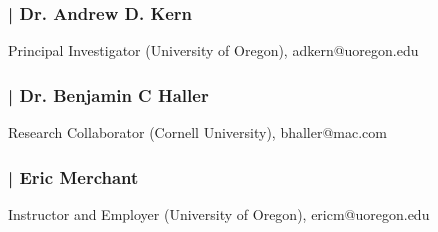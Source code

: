 \documentclass[paper=a4,fontsize=11pt]{scrartcl} %
\begin{document}
\subsubsection*{| Dr. Andrew D. Kern}
\begin{center}
Principal Investigator (University of Oregon),
adkern@uoregon.edu
\end{center}

\subsubsection*{| Dr. Benjamin C Haller} 
\begin{center}
Research Collaborator (Cornell University),
bhaller@mac.com
\end{center}

\subsubsection*{| Eric Merchant} 
\begin{center}
Instructor and Employer (University of Oregon), 
ericm@uoregon.edu
\end{center}
\end{document}
